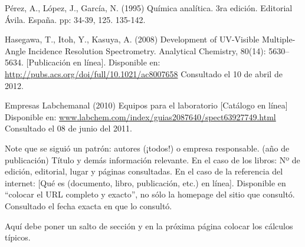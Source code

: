 \documentclass[12pt,letterpaper,twocolumn,twoside]{article}
\begin{document}
\renewcommand{\refname}{REFERENCIAS}
\begin{thebibliography}{5}


Pérez, A., López, J., García, N. (1995) Química analítica. 3ra edición. Editorial Ávila. España. pp: 34-39, 125. 135-142.

Hasegawa, T., Itoh, Y., Kasuya, A. (2008) Development of UV-Visible Multiple-Angle Incidence Resolution Spectrometry. Analytical Chemistry, 80(14): 5630–5634. [Publicación en línea]. Disponible en:
\url{http://pubs.acs.org/doi/full/10.1021/ac8007658} Consultado el 10 de abril de 2012.

Empresas Labchemanal (2010) Equipos para el laboratorio [Catálogo en línea] Disponible en: \url{www.labchem.com/index/guias2087640/spect63927749.html} Consultado el 08 de junio del 2011.

\end{thebibliography}

Note que se siguió un patrón: autores (¡todos!) o empresa responsable. (año de publicación) Título y demás información relevante. En el caso de los libros: Nº de edición, editorial, lugar y páginas consultadas. En el caso de la referencia del internet: [Qué es (documento, libro, publicación, etc.) en línea]. Disponible en ``colocar el URL completo y exacto'', no sólo la homepage del sitio que consultó. Consultado el fecha exacta en que lo consultó.

Aquí debe poner un salto de sección y en la próxima página colocar los cálculos típicos.

\newpage

\end{document}
